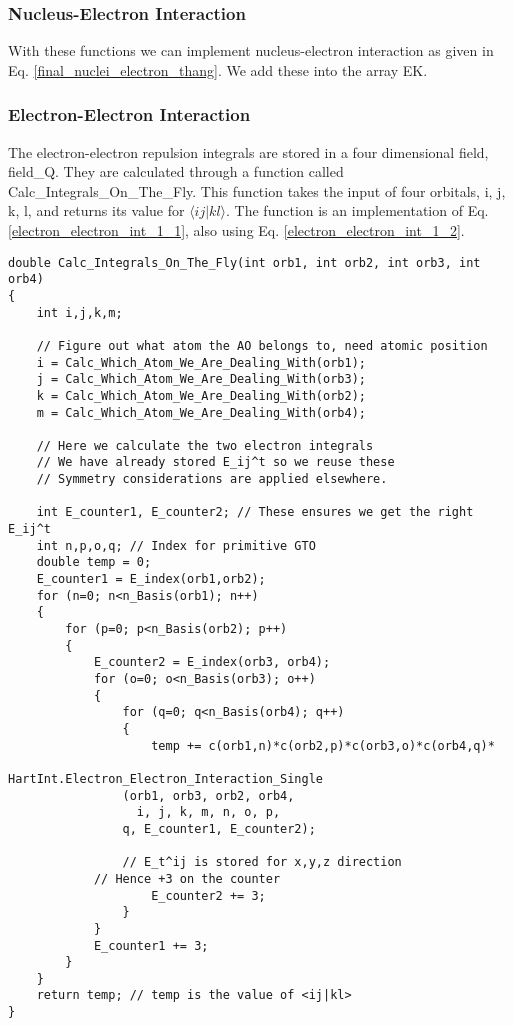 \documentclass[a4paper,norsk,11pt,twoside]{report}
\begin{document}
\subsubsection{Nucleus-Electron Interaction}
With these functions we can implement nucleus-electron interaction as
given in Eq. \eqref{final_nuclei_electron_thang}. We add these into
the array EK.

\subsubsection{Electron-Electron Interaction}
The electron-electron repulsion integrals are stored in a four
dimensional field, field\_Q. They are calculated through a function
called Calc\_Integrals\_On\_The\_Fly. This function takes the input of
four orbitals, i, j, k, l, and returns its value for $\langle i j | k
l \rangle$. The function is an implementation of
Eq. \eqref{electron_electron_int_1_1}, also using
Eq. \eqref{electron_electron_int_1_2}. \\

\begin{lstlisting}
double Calc_Integrals_On_The_Fly(int orb1, int orb2, int orb3, int orb4)
{    
    int i,j,k,m;

    // Figure out what atom the AO belongs to, need atomic position
    i = Calc_Which_Atom_We_Are_Dealing_With(orb1);
    j = Calc_Which_Atom_We_Are_Dealing_With(orb3);
    k = Calc_Which_Atom_We_Are_Dealing_With(orb2);
    m = Calc_Which_Atom_We_Are_Dealing_With(orb4);

    // Here we calculate the two electron integrals
    // We have already stored E_ij^t so we reuse these
    // Symmetry considerations are applied elsewhere.

    int E_counter1, E_counter2; // These ensures we get the right E_ij^t
    int n,p,o,q; // Index for primitive GTO
    double temp = 0;
    E_counter1 = E_index(orb1,orb2);
    for (n=0; n<n_Basis(orb1); n++)
    {
        for (p=0; p<n_Basis(orb2); p++)
        {
            E_counter2 = E_index(orb3, orb4);
            for (o=0; o<n_Basis(orb3); o++)
            {
                for (q=0; q<n_Basis(orb4); q++)
                {
                    temp += c(orb1,n)*c(orb2,p)*c(orb3,o)*c(orb4,q)*
                            HartInt.Electron_Electron_Interaction_Single
                (orb1, orb3, orb2, orb4,
                  i, j, k, m, n, o, p,
                q, E_counter1, E_counter2);

                // E_t^ij is stored for x,y,z direction
            // Hence +3 on the counter
                    E_counter2 += 3;
                }
            }
            E_counter1 += 3;
        }
    }
    return temp; // temp is the value of <ij|kl>
}
\end{lstlisting}
\end{document}
